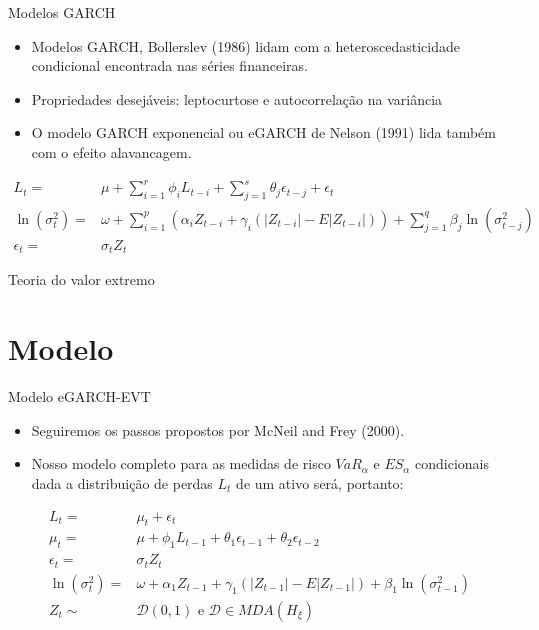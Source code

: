 \documentclass[ignorenonframetext,]{beamer}
\providecommand{\tightlist}{%
\setlength{\itemsep}{0pt}\setlength{\parskip}{0pt}}
\begin{document}
\begin{frame}{Modelos GARCH}

\begin{itemize}
\item
  Modelos GARCH, Bollerslev (1986) lidam com a heteroscedasticidade
  condicional encontrada nas séries financeiras.
\item
  Propriedades desejáveis: leptocurtose e autocorrelação na variância
\item
  O modelo GARCH exponencial ou eGARCH de Nelson (1991) lida também com
  o efeito alavancagem.
\end{itemize}

\begin{align*}
    L_t=&\mu+ \sum_{i=1}^r\phi_i L_{t-i}+ \sum\limits_{j=1}^{s}\theta_j\epsilon_{t-j} +\epsilon_t \\
    \ln(\sigma_t^2)=&\omega+ \sum\limits_{i=1}^{p}(\alpha_i Z_{t-i}+ \gamma_i(|Z_{t-i}|-E|Z_{t-i}|))+ \sum\limits_{j=1}^{q}\beta_j \ln(\sigma_{t-j}^2) \\
    \epsilon_t=&\sigma_t Z_t
\end{align*}

\end{frame}

\begin{frame}{Teoria do valor extremo}

\end{frame}

\section{Modelo}\label{modelo}

\begin{frame}{Modelo eGARCH-EVT}

\begin{itemize}
\tightlist
\item
  Seguiremos os passos propostos por McNeil and Frey (2000).
\item
  Nosso modelo completo para as medidas de risco \(VaR_\alpha\) e
  \(ES_\alpha\) condicionais dada a distribuição de perdas \(L_t\) de um
  ativo será, portanto:
\end{itemize}

\begin{align}
L_t=&\mu_t+\epsilon_t \\
\mu_t=&\mu+ \phi_1 L_{t-1}+ \theta_1\epsilon_{t-1}+ \theta_2\epsilon_{t-2} \label{eq:mut} \\
\epsilon_t=&\sigma_t Z_t\\
\ln(\sigma_t^2)=&\omega+ \alpha_1 Z_{t-1}+ \gamma_1(|Z_{t-1}|-E|Z_{t-1}|)+ \beta_1 \ln(\sigma_{t-1}^2) \label{eq:sigma2} \\
Z_t\sim &\mathcal{D}(0,1) \text{ e } \mathcal{D} \in MDA(H_\xi)
\end{align}

\end{frame}
\end{document}
